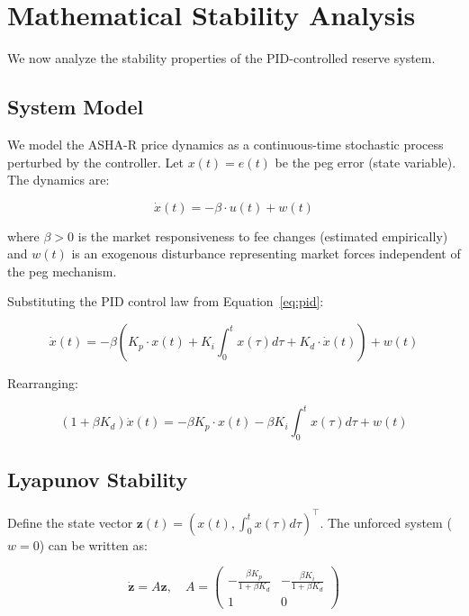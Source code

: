 \documentclass[11pt,a4paper]{article}
\newcommand{\ashares}{\textsc{ASHA-R}\xspace}
\begin{document}
\section{Mathematical Stability Analysis}
\label{sec:stability}

We now analyze the stability properties of the PID-controlled reserve system.

\subsection{System Model}

We model the \ashares price dynamics as a continuous-time stochastic process perturbed by the controller.
Let $x(t) = e(t)$ be the peg error (state variable).
The dynamics are:

\begin{equation}
  \dot{x}(t) = -\beta \cdot u(t) + w(t)
  \label{eq:dynamics}
\end{equation}

where $\beta > 0$ is the market responsiveness to fee changes (estimated empirically) and $w(t)$ is an exogenous disturbance representing market forces independent of the peg mechanism.

Substituting the PID control law from Equation~\eqref{eq:pid}:

\begin{equation}
  \dot{x}(t) = -\beta \left(K_p \cdot x(t) + K_i \int_0^t x(\tau) d\tau + K_d \cdot \dot{x}(t)\right) + w(t)
\end{equation}

Rearranging:

\begin{equation}
  (1 + \beta K_d) \dot{x}(t) = -\beta K_p \cdot x(t) - \beta K_i \int_0^t x(\tau) d\tau + w(t)
  \label{eq:closed_loop}
\end{equation}

\subsection{Lyapunov Stability}

Define the state vector $\mathbf{z}(t) = (x(t), \int_0^t x(\tau) d\tau)^\top$.
The unforced system ($w = 0$) can be written as:

\begin{equation}
  \dot{\mathbf{z}} = A \mathbf{z}, \quad A = \begin{pmatrix} -\frac{\beta K_p}{1 + \beta K_d} & -\frac{\beta K_i}{1 + \beta K_d} \\ 1 & 0 \end{pmatrix}
\end{equation}
\end{document}
